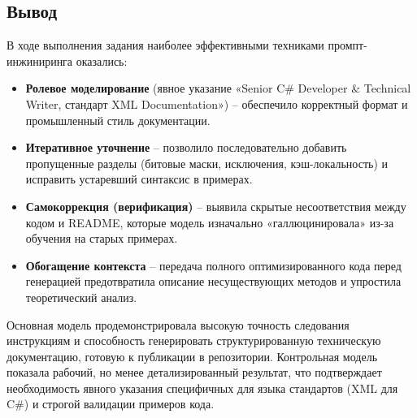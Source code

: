 \subsection{Вывод}
В ходе выполнения задания наиболее эффективными техниками промпт-инжиниринга оказались:
\begin{itemize}
\item \textbf{Ролевое моделирование} (явное указание «Senior C\# Developer & Technical Writer, стандарт XML Documentation») – обеспечило корректный формат и промышленный стиль документации.
\item \textbf{Итеративное уточнение} – позволило последовательно добавить пропущенные разделы (битовые маски, исключения, кэш-локальность) и исправить устаревший синтаксис в примерах.
\item \textbf{Самокоррекция (верификация)} – выявила скрытые несоответствия между кодом и README, которые модель изначально «галлюцинировала» из-за обучения на старых примерах.
\item \textbf{Обогащение контекста} – передача полного оптимизированного кода перед генерацией предотвратила описание несуществующих методов и упростила теоретический анализ.
\end{itemize}
Основная модель продемонстрировала высокую точность следования инструкциям и способность генерировать структурированную техническую документацию, готовую к публикации в репозитории. Контрольная модель показала рабочий, но менее детализированный результат, что подтверждает необходимость явного указания специфичных для языка стандартов (XML для C\#) и строгой валидации примеров кода.